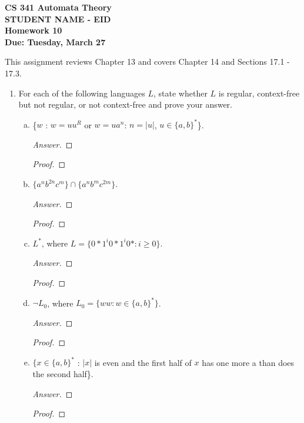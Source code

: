 \documentclass[10pt]{article}
\newcommand{\card}[1]{\left| #1 \right|}
\begin{document}
\begin{flushleft}
\textbf{\noindent
CS 341 Automata Theory \\
STUDENT NAME - EID \\
Homework 10 \\
Due: Tuesday, March 27}\\
\end{flushleft}
\noindent
This assignment reviews Chapter 13 and covers Chapter 14 and Sections 17.1 - 17.3. \\

\begin{enumerate}[1)]


\item
For each of the following languages $L$, state whether $L$ is regular, context-free but not regular, or not context-free and prove your answer.
\begin{enumerate}[a)]
\item
\{$w$ : $w = uu^R$ or $w = ua^n$: $n = \card{u}$, $u \in \{a, b\}^*$\}.
\begin{proof}[Answer]
\end{proof}
\begin{proof}[Proof]
\end{proof}

\item
$\{a^nb^{2n}c^m\} \cap \{a^nb^mc^{2m}\}$.
\begin{proof}[Answer]
\end{proof}
\begin{proof}[Proof]
\end{proof}

\item
$L^*$, where $L = \{0*1^i0*1^i0* : i \geq 0\}$.
\begin{proof}[Answer]
\end{proof}
\begin{proof}[Proof]
\end{proof}

\item
$\lnot L_0$, where $L_0 = \{ww : w \in \{a, b\}^*\}$.
\begin{proof}[Answer]
\end{proof}
\begin{proof}[Proof]
\end{proof}

\item
$\{x \in \{a, b\}^*$ : $\card{x}$ is even and the first half of $x$ has one more a than does the second half\}.
\begin{proof}[Answer]
\end{proof}
\begin{proof}[Proof]
\end{proof}
\end{enumerate}


\end{enumerate}
\end{document}
